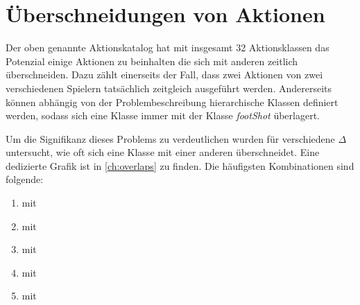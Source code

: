 
\section{Überschneidungen von Aktionen}

Der oben genannte Aktionskatalog hat mit insgesamt 32 Aktionsklassen das Potenzial einige Aktionen zu beinhalten die sich mit anderen zeitlich überschneiden.
Dazu zählt einerseits der Fall, dass zwei Aktionen von zwei verschiedenen Spielern tatsächlich zeitgleich ausgeführt werden.
Andererseits können abhängig von der Problembeschreibung \zB hierarchische Klassen definiert werden, sodass sich eine Klasse  immer mit der Klasse \emph{footShot} überlagert.

Um die Signifikanz dieses Problems zu verdeutlichen wurden für verschiedene $\Delta$ untersucht, wie oft sich eine Klasse mit einer anderen überschneidet.
Eine dedizierte Grafik ist in \autoref{ch:overlaps} zu finden.
Die häufigsten Kombinationen sind folgende:

\begin{enumerate}
    \item {} mit 
    \item {} mit 
    \item {} mit 
    \item {} mit 
    \item {} mit 
\end{enumerate}

